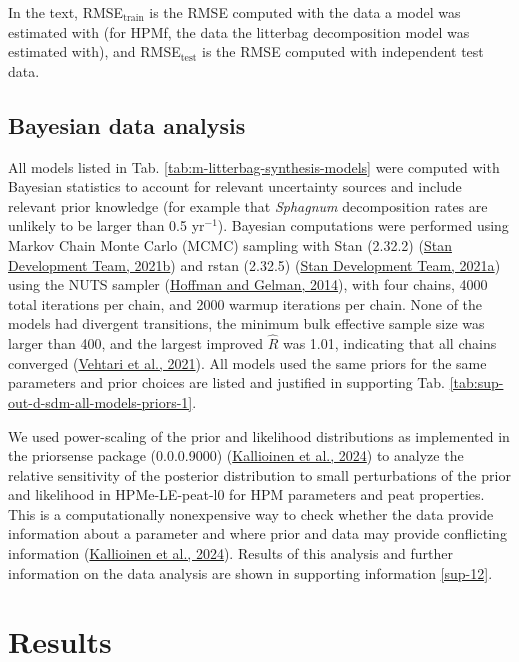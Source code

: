 \documentclass[
  12pt,
]{article}
\begin{document}
In the text, RMSE\(_\text{train}\) is the RMSE computed with the data a model was estimated with (for HPMf, the data the litterbag decomposition model was estimated with), and RMSE\(_\text{test}\) is the RMSE computed with independent test data.

\hypertarget{sdm-003-methods-13}{%
\subsection{Bayesian data analysis}\label{sdm-003-methods-13}}

All models listed in Tab. \ref{tab:m-litterbag-synthesis-models} were computed with Bayesian statistics to account for relevant uncertainty sources and include relevant prior knowledge (for example that \emph{Sphagnum} decomposition rates are unlikely to be larger than 0.5 yr\(^{-1}\)). Bayesian computations were performed using Markov Chain Monte Carlo (MCMC) sampling with Stan (2.32.2) (\protect\hyperlink{ref-StanDevelopmentTeam.2021a}{Stan Development Team, 2021b}) and rstan (2.32.5) (\protect\hyperlink{ref-StanDevelopmentTeam.2021b}{Stan Development Team, 2021a}) using the NUTS sampler (\protect\hyperlink{ref-Hoffman.2014}{Hoffman and Gelman, 2014}), with four chains, 4000 total iterations per chain, and 2000 warmup iterations per chain. None of the models had divergent transitions, the minimum bulk effective sample size was larger than 400, and the largest improved \(\hat{R}\) was 1.01, indicating that all chains converged (\protect\hyperlink{ref-Vehtari.2021}{Vehtari et al., 2021}). All models used the same priors for the same parameters and prior choices are listed and justified in supporting Tab. \ref{tab:sup-out-d-sdm-all-models-priors-1}.

We used power-scaling of the prior and likelihood distributions as implemented in the priorsense package (0.0.0.9000) (\protect\hyperlink{ref-Kallioinen.2024}{Kallioinen et al., 2024}) to analyze the relative sensitivity of the posterior distribution to small perturbations of the prior and likelihood in HPMe-LE-peat-l0 for HPM parameters and peat properties. This is a computationally nonexpensive way to check whether the data provide information about a parameter and where prior and data may provide conflicting information (\protect\hyperlink{ref-Kallioinen.2024}{Kallioinen et al., 2024}). Results of this analysis and further information on the data analysis are shown in supporting information \ref{sup-12}.

\hypertarget{results}{%
\section{Results}\label{results}}
\end{document}
